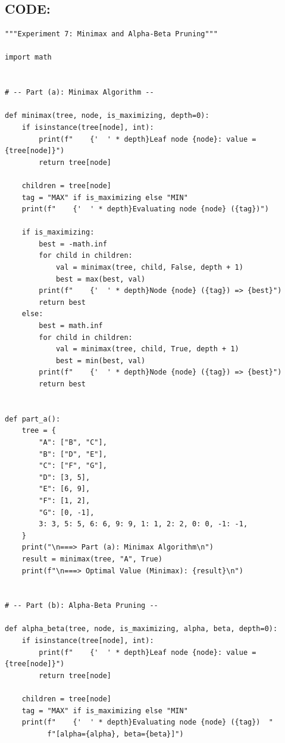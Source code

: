 \documentclass[12pt,a4paper]{article}
\begin{document}
\subsection{CODE:}

\begin{lstlisting}
"""Experiment 7: Minimax and Alpha-Beta Pruning"""

import math


# -- Part (a): Minimax Algorithm --

def minimax(tree, node, is_maximizing, depth=0):
    if isinstance(tree[node], int):
        print(f"    {'  ' * depth}Leaf node {node}: value = {tree[node]}")
        return tree[node]

    children = tree[node]
    tag = "MAX" if is_maximizing else "MIN"
    print(f"    {'  ' * depth}Evaluating node {node} ({tag})")

    if is_maximizing:
        best = -math.inf
        for child in children:
            val = minimax(tree, child, False, depth + 1)
            best = max(best, val)
        print(f"    {'  ' * depth}Node {node} ({tag}) => {best}")
        return best
    else:
        best = math.inf
        for child in children:
            val = minimax(tree, child, True, depth + 1)
            best = min(best, val)
        print(f"    {'  ' * depth}Node {node} ({tag}) => {best}")
        return best


def part_a():
    tree = {
        "A": ["B", "C"],
        "B": ["D", "E"],
        "C": ["F", "G"],
        "D": [3, 5],
        "E": [6, 9],
        "F": [1, 2],
        "G": [0, -1],
        3: 3, 5: 5, 6: 6, 9: 9, 1: 1, 2: 2, 0: 0, -1: -1,
    }
    print("\n===> Part (a): Minimax Algorithm\n")
    result = minimax(tree, "A", True)
    print(f"\n===> Optimal Value (Minimax): {result}\n")


# -- Part (b): Alpha-Beta Pruning --

def alpha_beta(tree, node, is_maximizing, alpha, beta, depth=0):
    if isinstance(tree[node], int):
        print(f"    {'  ' * depth}Leaf node {node}: value = {tree[node]}")
        return tree[node]

    children = tree[node]
    tag = "MAX" if is_maximizing else "MIN"
    print(f"    {'  ' * depth}Evaluating node {node} ({tag})  "
          f"[alpha={alpha}, beta={beta}]")


\end{lstlisting}
\end{document}
